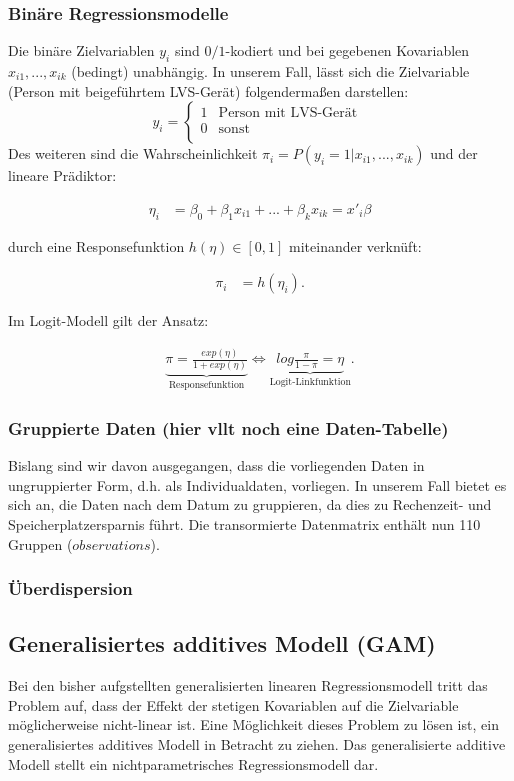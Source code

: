 \documentclass[12pt]{article}
\begin{document}
	\subsubsection{Binäre Regressionsmodelle}
	Die binäre Zielvariablen $y_{i}$ sind $0/1$-kodiert und bei gegebenen Kovariablen $x_{i1},...,x_{ik}$ (bedingt) unabhängig. In unserem Fall, lässt sich die Zielvariable (Person mit beigeführtem LVS-Gerät) folgendermaßen darstellen:
	\[y_{i}=\begin{cases}
	1 & \text{Person mit LVS-Gerät } \\
	0 & \text{sonst} \\
	\end{cases}\]
	Des weiteren sind die Wahrscheinlichkeit $\pi_{i}=P(y_{i}=1|x_{i1},...,x_{ik})$ und der lineare Prädiktor:
	
	\begin{align}
	\eta _{i}&= \beta _{0}+ \beta _{1}x_{i1}+...+ \beta _{k}x_{ik}=x'_{i} \beta 
	\end{align}
	
	durch eine Responsefunktion $h(\eta)\in[0,1]$ miteinander verknüft:
	
	\begin{align}
	\pi_{i}&=h(\eta_{i}).
	\end{align}
	
	Im Logit-Modell gilt der Ansatz:
	
	\begin{align}
	\underbrace{\pi=\frac{exp(\eta)}{1+exp(\eta)}}_{\text{Responsefunktion}} \iff \underbrace{log\frac{\pi}{1-\pi}=\eta}_{\text{Logit-Linkfunktion}}.
	\end{align}
	
	\subsubsection{Gruppierte Daten (hier vllt noch eine Daten-Tabelle)}
	Bislang sind wir davon ausgegangen, dass die vorliegenden Daten in ungruppierter Form, d.h. als Individualdaten, vorliegen. In unserem Fall bietet es sich an, die Daten nach dem Datum zu gruppieren, da dies zu Rechenzeit- und Speicherplatzersparnis führt. Die transormierte Datenmatrix enthält nun 110 Gruppen ($observations$).
	
	\subsubsection{Überdispersion}
	\subsection{Generalisiertes additives Modell (GAM)}
	Bei den bisher aufgstellten generalisierten linearen Regressionsmodell tritt das Problem auf, dass der Effekt der stetigen Kovariablen auf die Zielvariable möglicherweise nicht-linear ist. Eine Möglichkeit dieses Problem zu lösen ist, ein generalisiertes additives Modell in Betracht zu ziehen.
	Das generalisierte additive Modell stellt ein nichtparametrisches Regressionsmodell dar.
\end{document}
